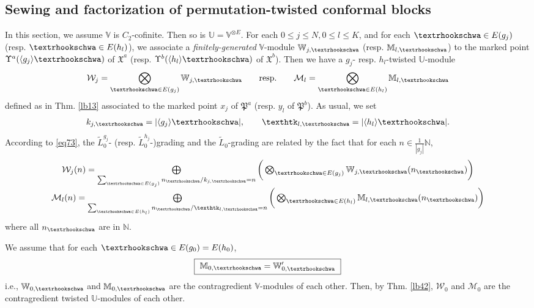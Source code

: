 \documentclass[12pt,a4paper,notitlepage]{article}
\theoremstyle{definition}
\theoremstyle{plain}
\newcommand{\fk}{\mathfrak}
\newcommand{\mc}{\mathcal}
\newcommand{\wtd}{\widetilde}
\newcommand{\bk}[1]{\langle {#1}\rangle}
\newcommand{\Vbb}{\mathbb V}
\newcommand{\Ubb}{\mathbb U}
\newcommand{\Wbb}{\mathbb W}
\newcommand{\Mbb}{\mathbb M}
\newcommand{\Nbb}{\mathbb N}
\newcommand{\tipae}{\text{\textrhookschwa}}
\newcommand{\tipak}{\text{\texthtk}}
\numberwithin{equation}{subsection}
\begin{document}
\subsection{Sewing and factorization of permutation-twisted conformal blocks}

In this section, we assume $\Vbb$ is $C_2$-cofinite. Then so is $\Ubb=\Vbb^{\otimes E}$. For each $0\leq j\leq N,0\leq l\leq K$, and for each $\tipae\in E(g_j)$ (resp. $\tipae\in E(h_l)$), we associate a \emph{finitely-generated} $\Vbb$-module $\Wbb_{j,\tipae}$ (resp. $\Mbb_{l,\tipae}$) to the marked point $\Upsilon^a(\bk{g_j}\tipae)$ of $\fk X^a$ (resp. $\Upsilon^b(\bk{h_l}\tipae)$ of $\fk X^b$). Then we have a $g_j$- resp. $h_l$-twisted $\Ubb$-module
\begin{gather*}
\mc W_j=\bigotimes_{\tipae\in E(g_j)}\Wbb_{j,\tipae}\qquad \text{resp.}\qquad 	\mc M_l=\bigotimes_{\tipae\in E(h_l)}\Mbb_{l,\tipae}
\end{gather*}
defined as in Thm. \ref{lb13} associated to the marked point $x_j$ of $\fk P^a$ (resp. $y_l$ of $\fk P^b$). As usual, we set
\begin{align*}
k_{j,\tipae}=|\bk{g_j}\tipae|,\qquad \tipak_{l,\tipae}=|\bk{h_l}\tipae|.	
\end{align*}
According to \eqref{eq73}, the $\wtd L_0^{g_j}$- (resp. $\wtd L_0^{h_j}$-)grading and the $\wtd L_0$-grading are related by the fact that for each $n\in\frac 1{|g_j|}\Nbb$,
\begin{gather}\label{eq74}
\begin{array}{c}
\mc W_j(n)=\bigoplus\limits_{\sum_{\tipae\in E(g_j)}n_{\tipae}/k_{j,\tipae}=n}\bigg(\bigotimes_{\tipae\in E(g_j)}\Wbb_{j,\tipae}(n_\tipae)\bigg)\\[1.5ex]
\mc M_l(n)=\bigoplus\limits_{\sum_{\tipae\in E(h_l)}n_{\tipae}/\tipak_{l,\tipae}=n}\bigg(\bigotimes_{\tipae\in E(h_l)}\Mbb_{l,\tipae}(n_\tipae)\bigg)
\end{array}	
\end{gather}
where all $n_\tipae$ are in $\Nbb$.

We assume that for each $\tipae\in E(g_0)=E(h_0)$,
\begin{align*}
\boxed{~\Mbb_{0,\tipae}=\Wbb_{0,\tipae}'~}
\end{align*}
i.e., $\Wbb_{0,\tipae}$ and $\Mbb_{0,\tipae}$ are the contragredient $\Vbb$-modules of each other.  Then, by Thm. \ref{lb42}, $\mc W_0$ and $\mc M_0$ are the contragredient twisted $\Ubb$-modules of each other.
\end{document}
